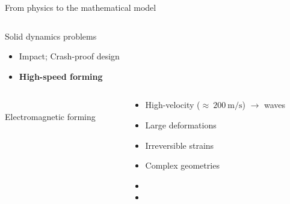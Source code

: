 \begin{withoutheadline}
  \begin{frame}{From physics to the mathematical model}
  \vspace{-0.6cm}
  \begin{overprint}
    
    \begin{columns}
      \begin{column}{0.45\textwidth}
        \begin{block}{Solid dynamics problems}
          \begin{itemize}
          \item[] Impact; Crash-proof design
          \item[] \textbf{High-speed forming}
          \end{itemize}
        \end{block}
      \end{column}
      
      \begin{column}{0.55\textwidth}
      \end{column}
    \end{columns}

    
    \begin{columns}
      \begin{column}{0.45\textwidth}
        \centering
        \\
    \scriptsize Electromagnetic forming \cite{Guillaume}
      \end{column}
      \begin{column}{0.45\textwidth}
        \begin{block}{}
          \begin{footnotesize}
            \begin{itemize}
            \item High-velocity ($\approx \: 200\:\text{m/s}$) $\rightarrow$ waves
            \item Large deformations
            \item Irreversible strains
            \item Complex geometries
            \item[]
            \item[]
            \end{itemize}
          \end{footnotesize}
        \end{block}  
      \end{column}
    \end{columns}
    

\end{overprint}
\end{frame}
\end{withoutheadline}
